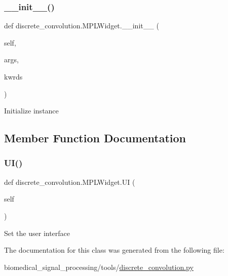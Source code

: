 \subsubsection{\texorpdfstring{\+\_\+\+\_\+init\+\_\+\+\_\+()}{\_\_init\_\_()}}
{\footnotesize\ttfamily def discrete\+\_\+convolution.\+M\+P\+L\+Widget.\+\_\+\+\_\+init\+\_\+\+\_\+ (\begin{DoxyParamCaption}\item[{}]{self,  }\item[{}]{args,  }\item[{}]{kwrds }\end{DoxyParamCaption})}

\begin{DoxyVerb}Initialize instance
\end{DoxyVerb}
 

\subsection{Member Function Documentation}
\mbox{\label{classdiscrete__convolution_1_1MPLWidget_a7d1f966ed43f2100c28c8b114d8bba4e}} 
\subsubsection{\texorpdfstring{U\+I()}{UI()}}
{\footnotesize\ttfamily def discrete\+\_\+convolution.\+M\+P\+L\+Widget.\+UI (\begin{DoxyParamCaption}\item[{}]{self }\end{DoxyParamCaption})}

\begin{DoxyVerb}Set the user interface
\end{DoxyVerb}
 

The documentation for this class was generated from the following file\+:\begin{DoxyCompactItemize}
\item 
biomedical\+\_\+signal\+\_\+processing/tools/\hyperlink{discrete__convolution_8py}{discrete\+\_\+convolution.\+py}\end{DoxyCompactItemize}
